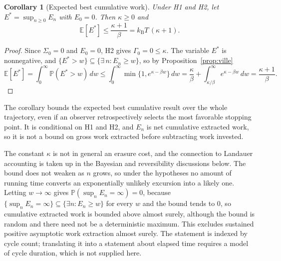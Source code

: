 \documentclass[11pt]{article}
\newtheorem{corollary}{Corollary}
\theoremstyle{definition}
\theoremstyle{remark}
\newcommand{\E}{\mathbb{E}}
\renewcommand{\Pr}{\mathbb{P}}
\newcommand{\kB}{k_{\mathrm B}}
\begin{document}
\begin{corollary}[Expected best cumulative work]\label{cor:expmax}
Under H1 and H2, let $E^{*} = \sup_{n \ge 0} E_n$ with $E_0 = 0$. Then $\kappa \ge 0$ and
\[
\E[E^{*}] \le \frac{\kappa + 1}{\beta} = \kB T\,(\kappa + 1).
\]
\end{corollary}

\begin{proof}
Since $\Sigma_0 = 0$ and $E_0 = 0$, H2 gives $\Gamma_0 = 0 \le \kappa$. The variable $E^{*}$ is nonnegative, and $\{E^{*} > w\} \subseteq \{\exists\, n : E_n \ge w\}$, so by Proposition~\ref{prop:ville}
\[
\E[E^{*}] = \int_0^\infty \Pr(E^{*} > w)\,dw \le \int_0^\infty \min\{1, e^{\kappa - \beta w}\}\,dw = \frac{\kappa}{\beta} + \int_{\kappa/\beta}^\infty e^{\kappa - \beta w}\,dw = \frac{\kappa + 1}{\beta}.
\]
\end{proof}

The corollary bounds the expected best cumulative result over the whole trajectory, even if an observer retrospectively selects the most favorable stopping point. It is conditional on H1 and H2, and $E_n$ is net cumulative extracted work, so it is not a bound on gross work extracted before subtracting work invested.

The constant $\kappa$ is not in general an erasure cost, and the connection to Landauer accounting is taken up in the Bayesian and reversibility discussions below. The bound does not weaken as $n$ grows, so under the hypotheses no amount of running time converts an exponentially unlikely excursion into a likely one. Letting $w \to \infty$ gives $\Pr(\sup_n E_n = \infty) = 0$, because $\{\sup_n E_n = \infty\} \subseteq \{\exists n : E_n \ge w\}$ for every $w$ and the bound tends to $0$, so cumulative extracted work is bounded above almost surely, although the bound is random and there need not be a deterministic maximum. This excludes sustained positive asymptotic work extraction almost surely. The statement is indexed by cycle count; translating it into a statement about elapsed time requires a model of cycle duration, which is not supplied here.
\end{document}
